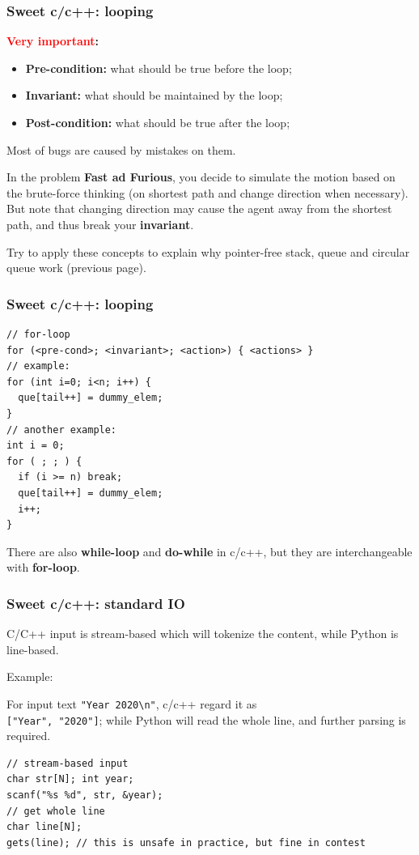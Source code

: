 \documentclass{beamer}
\begin{document}
\begin{frame}[fragile]
  \frametitle{Sweet c/c++: looping}

\textbf{\textcolor{red}{Very important}:}
\begin{itemize}
  \item \textbf{Pre-condition:} what should be true before the loop;
  \item \textbf{Invariant:} what should be maintained by the loop;
  \item \textbf{Post-condition:} what should be true after the loop;
\end{itemize}
Most of bugs are caused by mistakes on them.
\begin{example}
  \footnotesize{
  In the problem \textbf{Fast ad Furious}, you decide to simulate the motion 
  based on the brute-force thinking (on shortest path and change direction when necessary).
  But note that changing direction may cause the agent away from the shortest path, and thus break
  your \textbf{invariant}.
  }
\end{example}

Try to apply these concepts to explain why pointer-free stack, queue and circular queue work (previous page).
\end{frame}

\begin{frame}[fragile]
  \frametitle{Sweet c/c++: looping}
\begin{verbatim}
// for-loop
for (<pre-cond>; <invariant>; <action>) { <actions> }
// example:
for (int i=0; i<n; i++) {
  que[tail++] = dummy_elem;
}
// another example:
int i = 0;
for ( ; ; ) {
  if (i >= n) break;
  que[tail++] = dummy_elem;
  i++;
}
\end{verbatim}
There are also \textbf{while-loop} and \textbf{do-while} in c/c++, 
but they are interchangeable with \textbf{for-loop}.

\end{frame}

\begin{frame}[fragile]
  \frametitle{Sweet c/c++: standard IO}
C/C++ input is stream-based which will tokenize the content, while Python is line-based.

Example:

For input text \texttt{"Year 2020\textbackslash n"}, c/c++ regard it as\\
 \texttt{["Year", "2020"]};
while Python will read the whole line, and further parsing is required.

\begin{verbatim}
// stream-based input
char str[N]; int year;
scanf("%s %d", str, &year);
// get whole line
char line[N];
gets(line); // this is unsafe in practice, but fine in contest
\end{verbatim}

\end{frame}
\end{document}
